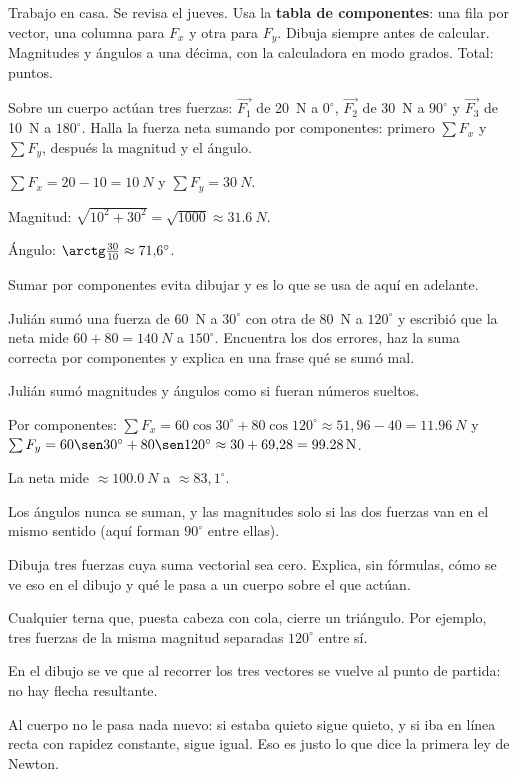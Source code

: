 \documentclass[11pt]{article}
\begin{document}
\encabezado

\begin{instrucciones}
Trabajo en casa. Se revisa el jueves. Usa la \textbf{tabla de componentes}: una fila por
vector, una columna para $F_x$ y otra para $F_y$. Dibuja siempre antes de calcular.
Magnitudes y ángulos a una décima, con la calculadora en modo grados.
Total: \totalpuntos{} puntos.
\end{instrucciones}

\begin{preguntas}

\pregunta[2] Sobre un cuerpo actúan tres fuerzas: $\vec{F_1}$ de \qty{20}{N} a $0^\circ$,
$\vec{F_2}$ de \qty{30}{N} a $90^\circ$ y $\vec{F_3}$ de \qty{10}{N} a $180^\circ$. Halla la
fuerza neta sumando por componentes: primero $\sum F_x$ y $\sum F_y$, después la magnitud y el
ángulo.
\begin{solucion}[6cm]
$\sum F_x = 20 - 10 = \qty{10}{N}$ \quad y \quad $\sum F_y = \qty{30}{N}$.

Magnitud: $\sqrt{10^2 + 30^2} = \sqrt{1000} \approx \qty{31,6}{N}$.

Ángulo: $\arctg\frac{30}{10} \approx 71{,}6^\circ$.

Sumar por componentes evita dibujar y es lo que se usa de aquí en adelante.
\end{solucion}

\pregunta[2] Julián sumó una fuerza de \qty{60}{N} a $30^\circ$ con otra de \qty{80}{N} a
$120^\circ$ y escribió que la neta mide $60 + 80 = \qty{140}{N}$ a $150^\circ$. Encuentra los
dos errores, haz la suma correcta por componentes y explica en una frase qué se sumó mal.
\begin{solucion}[6.5cm]
Julián sumó magnitudes y ángulos como si fueran números sueltos.

Por componentes:
$\sum F_x = 60\cos 30^\circ + 80\cos 120^\circ \approx 51{,}96 - 40 = \qty{11,96}{N}$ \quad y
\quad $\sum F_y = 60\sen 30^\circ + 80\sen 120^\circ \approx 30 + 69{,}28 = \qty{99,28}{N}$.

La neta mide $\approx \qty{100,0}{N}$ a $\approx 83{,}1^\circ$.

Los ángulos nunca se suman, y las magnitudes solo si las dos fuerzas van en el mismo sentido
(aquí forman $90^\circ$ entre ellas).
\end{solucion}

\pregunta[1] Dibuja tres fuerzas cuya suma vectorial sea cero. Explica, sin fórmulas, cómo se
ve eso en el dibujo y qué le pasa a un cuerpo sobre el que actúan.
\begin{solucion}[5cm]
Cualquier terna que, puesta cabeza con cola, cierre un triángulo. Por ejemplo, tres fuerzas de
la misma magnitud separadas $120^\circ$ entre sí.

En el dibujo se ve que al recorrer los tres vectores se vuelve al punto de partida: no hay
flecha resultante.

Al cuerpo no le pasa nada nuevo: si estaba quieto sigue quieto, y si iba en línea recta con
rapidez constante, sigue igual. Eso es justo lo que dice la primera ley de Newton.
\end{solucion}

\end{preguntas}
\end{document}
